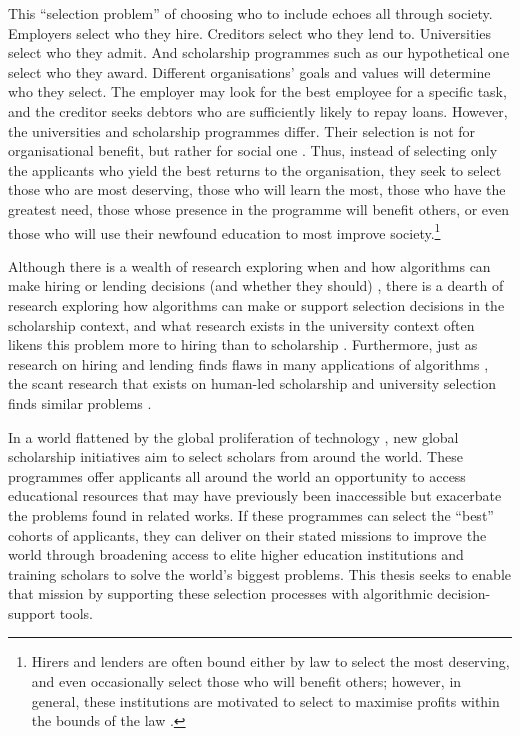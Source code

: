 This ``selection problem'' of choosing who to include echoes all through society. Employers select who they hire. Creditors select who they lend to. Universities select who they admit. And scholarship programmes such as our hypothetical one select who they award. Different organisations' goals and values will determine who they select. The employer may look for the best employee for a specific task, and the creditor seeks debtors who are sufficiently likely to repay loans. However, the universities and scholarship programmes differ. Their selection is not for organisational benefit, but rather for social one \cite{Warikoo_2019}. Thus, instead of selecting only the applicants who yield the best returns to the organisation, they seek to select those who are most deserving, those who will learn the most, those who have the greatest need, those whose presence in the programme will benefit others, or even those who will use their newfound education to most improve society.\footnote{Hirers and lenders are often bound either by law to select the most deserving, and even occasionally select those who will benefit others; however, in general, these institutions are motivated to select to maximise profits within the bounds of the law \cite{schmidt1998validity}.}

Although there is a wealth of research exploring when and how algorithms can make hiring or lending decisions (and whether they should) \cite{schmidt1998validity,schumann2017diverse,raghavan2020mitigating,horodyski_applicants_2023,Leung_Zhang_Jibuti_Zhao_Klein_Pierce_Robert_Zhu_2020}, there is a dearth of research exploring how algorithms can make or support selection decisions in the scholarship context, and what research exists in the university context often likens this problem more to hiring than to scholarship \cite{schumann2017diverse,Steel_Multiple_2018,ijcai2023p819}. Furthermore, just as research on hiring and lending finds flaws in many applications of algorithms \cite{raghavan2020mitigating,horodyski_applicants_2023,Peng_Nushi_Kıcıman_Inkpen_Suri_Kamar_2019}, the scant research that exists on human-led scholarship and university selection finds similar problems \cite{schumann2017diverse}.

In a world flattened by the global proliferation of technology \cite{Friedman_2005}, new global scholarship initiatives aim to select scholars from around the world. These programmes offer applicants all around the world an opportunity to access educational resources that may have previously been inaccessible but exacerbate the problems found in related works. If these programmes can select the ``best'' cohorts of applicants, they can deliver on their stated missions to improve the world through broadening access to elite higher education institutions and training scholars to solve the world's biggest problems. This thesis seeks to enable that mission by supporting these selection processes with algorithmic decision-support tools.

